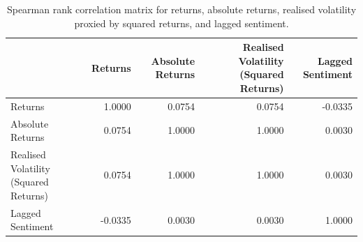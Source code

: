 \begin{table}
\caption{Spearman rank correlation matrix for returns, absolute returns, realised volatility proxied by squared returns, and lagged sentiment.}
\label{tab:correlation_spearman}
\begin{tabular}{lrrrr}
\toprule
 & Returns & Absolute Returns & Realised Volatility (Squared Returns) & Lagged Sentiment \\
\midrule
Returns & 1.0000 & 0.0754 & 0.0754 & -0.0335 \\
Absolute Returns & 0.0754 & 1.0000 & 1.0000 & 0.0030 \\
Realised Volatility (Squared Returns) & 0.0754 & 1.0000 & 1.0000 & 0.0030 \\
Lagged Sentiment & -0.0335 & 0.0030 & 0.0030 & 1.0000 \\
\bottomrule
\end{tabular}
\end{table}
